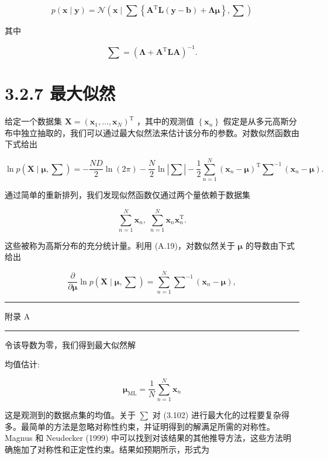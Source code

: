\documentclass[10pt]{report}
\newcommand{\HRule}{\begin{center}\rule{0.9\linewidth}{0.2mm}\end{center}}
\begin{document}
\[
p\left( {\mathbf{x} \mid  \mathbf{y}}\right)  = \mathcal{N}\left( {\mathbf{x} \mid  \mathbf{\sum }\left\{  {{\mathbf{A}}^{\mathrm{T}}\mathbf{L}\left( {\mathbf{y} - \mathbf{b}}\right)  + \mathbf{\Lambda }\mathbf{\mu }}\right\}  ,\mathbf{\sum }}\right)  \tag{3.100}
\]

其中

\[
\mathbf{\sum } = {\left( \mathbf{\Lambda } + {\mathbf{A}}^{\mathrm{T}}\mathbf{{LA}}\right) }^{-1}. \tag{3.101}
\]

\section*{3.2.7 最大似然}

给定一个数据集 \(\mathbf{X} = {\left( {\mathbf{x}}_{1},\ldots ,{\mathbf{x}}_{N}\right) }^{\mathrm{T}}\) ，其中的观测值 \(\left\{  {\mathbf{x}}_{n}\right\}\) 假定是从多元高斯分布中独立抽取的，我们可以通过最大似然法来估计该分布的参数。对数似然函数由下式给出

\[
\ln p\left( {\mathbf{X} \mid  \mathbf{\mu },\mathbf{\sum }}\right)  =  - \frac{ND}{2}\ln \left( {2\pi }\right)  - \frac{N}{2}\ln \left| \mathbf{\sum }\right|  - \frac{1}{2}\mathop{\sum }\limits_{{n = 1}}^{N}{\left( {\mathbf{x}}_{n} - \mathbf{\mu }\right) }^{\mathrm{T}}{\mathbf{\sum }}^{-1}\left( {{\mathbf{x}}_{n} - \mathbf{\mu }}\right) . \tag{3.102}
\]

通过简单的重新排列，我们发现似然函数仅通过两个量依赖于数据集

\[
\mathop{\sum }\limits_{{n = 1}}^{N}{\mathbf{x}}_{n},\;\mathop{\sum }\limits_{{n = 1}}^{N}{\mathbf{x}}_{n}{\mathbf{x}}_{n}^{\mathrm{T}}. \tag{3.103}
\]

这些被称为高斯分布的充分统计量。利用 (A.19)，对数似然关于 \(\mathbf{\mu }\) 的导数由下式给出

\[
\frac{\partial }{\partial \mathbf{\mu }}\ln p\left( {\mathbf{X} \mid  \mathbf{\mu },\mathbf{\sum }}\right)  = \mathop{\sum }\limits_{{n = 1}}^{N}{\mathbf{\sum }}^{-1}\left( {{\mathbf{x}}_{n} - \mathbf{\mu }}\right) , \tag{3.104}
\]

\HRule

附录 A

\HRule

令该导数为零，我们得到最大似然解

均值估计:

\[
{\mathbf{\mu }}_{\mathrm{{ML}}} = \frac{1}{N}\mathop{\sum }\limits_{{n = 1}}^{N}{\mathbf{x}}_{n} \tag{3.105}
\]

这是观测到的数据点集的均值。关于 \(\sum\) 对 (3.102) 进行最大化的过程要复杂得多。最简单的方法是忽略对称性约束，并证明得到的解满足所需的对称性。Magnus 和 Neudecker (1999) 中可以找到对该结果的其他推导方法，这些方法明确施加了对称性和正定性约束。结果如预期所示，形式为
\end{document}
